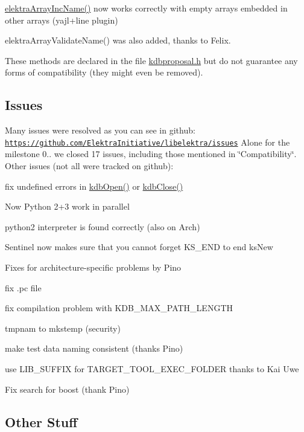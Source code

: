 \hyperlink{array_8c_afc46476b8d722d89e07a966e023df317}{elektra\+Array\+Inc\+Name()} now works correctly with empty arrays embedded in other arrays (yajl+line plugin)

elektra\+Array\+Validate\+Name() was also added, thanks to Felix.

These methods are declared in the file \hyperlink{kdbproposal_8h}{kdbproposal.\+h} but do not guarantee any forms of compatibility (they might even be removed).

\subsection*{Issues}

Many issues were resolved as you can see in github\+: \href{https://github.com/ElektraInitiative/libelektra/issues}{\tt https\+://github.\+com/\+Elektra\+Initiative/libelektra/issues} Alone for the milestone 0.. we closed 17 issues, including those mentioned in \char`\"{}\+Compatibility\char`\"{}. Other issues (not all were tracked on github)\+:


\begin{DoxyItemize}
\item fix undefined errors in \hyperlink{group__kdb_ga6808defe5870f328dd17910aacbdc6ca}{kdb\+Open()} or \hyperlink{group__kdb_gadb54dc9fda17ee07deb9444df745c96f}{kdb\+Close()}
\item Now Python 2+3 work in parallel
\item python2 interpreter is found correctly (also on Arch)
\item Sentinel now makes sure that you cannot forget K\+S\+\_\+\+E\+N\+D to end ks\+New
\item Fixes for architecture-\/specific problems by Pino
\item fix .pc file
\item fix compilation problem with K\+D\+B\+\_\+\+M\+A\+X\+\_\+\+P\+A\+T\+H\+\_\+\+L\+E\+N\+G\+T\+H
\item tmpnam to mkstemp (security)
\item make test data naming consistent (thanks Pino)
\item use L\+I\+B\+\_\+\+S\+U\+F\+F\+I\+X for T\+A\+R\+G\+E\+T\+\_\+\+T\+O\+O\+L\+\_\+\+E\+X\+E\+C\+\_\+\+F\+O\+L\+D\+E\+R thanks to Kai Uwe
\item Fix search for boost (thank Pino)
\end{DoxyItemize}

\subsection*{Other Stuff}

